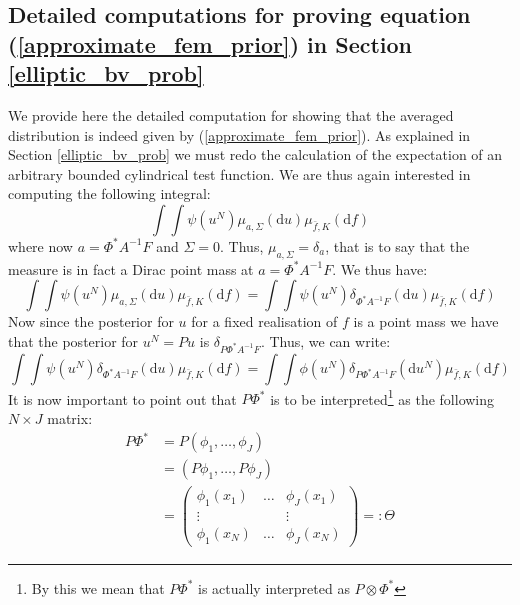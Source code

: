 \subsection{Detailed computations for proving equation (\ref{approximate_fem_prior}) in Section \textcolor{blue}{\ref{elliptic_bv_prob}}}

We provide here the detailed computation for showing that the averaged distribution is indeed given by (\ref{approximate_fem_prior}). As explained in Section \textcolor{blue}{\ref{elliptic_bv_prob}} we must redo the calculation of the expectation of an arbitrary bounded cylindrical test function. We are thus again interested in computing the following integral:
\begin{equation}
    \int\int\psi(u^{N})\mu_{a,\Sigma}(\mathrm{d}u)\mu_{\bar{f},K}(\mathrm{d}f)
\end{equation}
where now $a=\Phi^{*}A^{-1}F$ and $\Sigma=0$. Thus, $\mu_{a,\Sigma}=\delta_{a}$, that is to say that the measure is in fact a Dirac point mass at $a=\Phi^{*}A^{-1}F$. We thus have:
\begin{equation*}
    \int\int\psi(u^{N})\mu_{a,\Sigma}(\mathrm{d}u)\mu_{\bar{f},K}(\mathrm{d}f)=\int\int\psi(u^N)\delta_{\Phi^{*}A^{-1}F}(\mathrm{d}u)\mu_{\bar{f},K}(\mathrm{d}f)
\end{equation*}
Now since the posterior for $u$ for a fixed realisation of $f$ is a point mass we have that the posterior for $u^N=Pu$ is $\delta_{P\Phi^{*}A^{-1}F}$. Thus, we can write:
\begin{equation*}
    \int\int\psi(u^N)\delta_{\Phi^{*}A^{-1}F}(\mathrm{d}u)\mu_{\bar{f},K}(\mathrm{d}f)=\int\int\phi(u^N)\delta_{P\Phi^{*}A^{-1}F}(\mathrm{d}u^N)\mu_{\bar{f},K}(\mathrm{d}f)
\end{equation*}
It is now important to point out that $P\Phi^{*}$ is to be interpreted\footnote{By this we mean that $P\Phi^{*}$ is actually interpreted as $P\otimes\Phi^{*}$} as the following $N\times J$ matrix:
\begin{align*}
    P\Phi^{*}&=P(\phi_{1},\dots,\phi_{J}) \\
    &=(P\phi_{1},\dots,P\phi_{J}) \\
    &=\begin{pmatrix}
        \phi_{1}(x_1) & \dots & \phi_{J}(x_1) \\
        \vdots & & \vdots \\
        \phi_{1}(x_N) & \dots & \phi_{J}(x_N)
      \end{pmatrix}=:\Theta
\end{align*}
